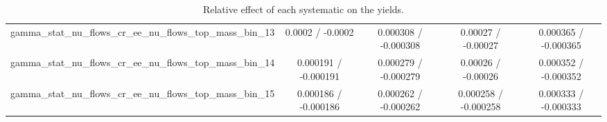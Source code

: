 \documentclass[10pt]{article}
\begin{document}
\begin{table}[htbp]
\begin{center}
\begin{tabular}{|c|c|c|c|c|}
  gamma_stat_nu_flows_cr_ee_nu_flows_top_mass_bin_13 & 0.0002 / -0.0002 & 0.000308 / -0.000308 & 0.00027 / -0.00027 & 0.000365 / -0.000365 \\ 
  gamma_stat_nu_flows_cr_ee_nu_flows_top_mass_bin_14 & 0.000191 / -0.000191 & 0.000279 / -0.000279 & 0.00026 / -0.00026 & 0.000352 / -0.000352 \\ 
  gamma_stat_nu_flows_cr_ee_nu_flows_top_mass_bin_15 & 0.000186 / -0.000186 & 0.000262 / -0.000262 & 0.000258 / -0.000258 & 0.000333 / -0.000333 \\ 
\hline 
\end{tabular} 
\caption{Relative effect of each systematic on the yields.} 
\end{center} 
\end{table} 
\end{document}
